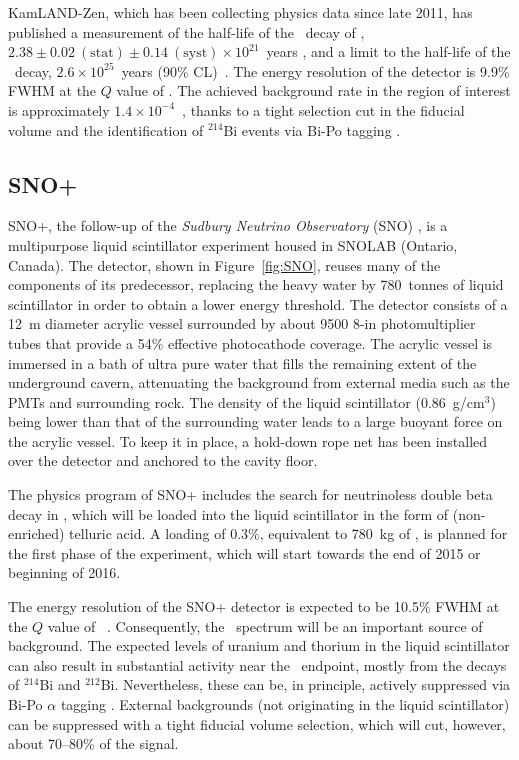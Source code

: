 \documentclass{PoS}
\begin{document}
KamLAND-Zen, which has been collecting physics data since late 2011, has published a measurement of the half-life of the \bbtnu\ decay of \XE, $2.38\pm0.02~(\mathrm{stat})\pm0.14~(\mathrm{syst})\times10^{21}$~years \cite{KamLANDZen:2012aa}, and a limit to the half-life of the \bbonu\ decay, $2.6\times10^{25}$~years (90\% CL)~\cite{Gando:2012zm, Asakura:2014lma}. The energy resolution of the detector is 9.9\% FWHM at the $Q$ value of \XE. The achieved background rate in the region of interest is approximately $1.4\times10^{-4}$~\ckky, thanks to a tight selection cut in the fiducial volume and the identification of $^{214}$Bi events via Bi-Po tagging \cite{Asakura:2014lma}.


\subsection{SNO+} \label{subsec:SNO+}
SNO+, the follow-up of the \emph{Sudbury Neutrino Observatory} (SNO) \cite{Boger:1999bb}, is a multipurpose liquid scintillator experiment housed in SNOLAB (Ontario, Canada). The detector, shown in Figure~\ref{fig:SNO}, reuses many of the components of its predecessor, replacing the heavy water by 780~tonnes of liquid scintillator in order to obtain a lower energy threshold. The detector consists of a 12~m diameter acrylic vessel surrounded by about 9500 8-in photomultiplier tubes that provide a 54\% effective photocathode coverage. The acrylic vessel is immersed in a bath of ultra pure water that fills the remaining extent of the underground cavern, attenuating the background from external media such as the PMTs and surrounding rock. The density of the liquid scintillator (0.86~g/cm$^{3}$) being lower than that of the surrounding water leads to a large buoyant force on the acrylic vessel. To keep it in place, a hold-down rope net has been installed over the detector and anchored to the cavity floor.

The physics program of SNO+ includes the search for neutrinoless double beta decay in \TE, which will be loaded into the liquid scintillator in the form of (non-enriched) telluric acid. A loading of 0.3\%, equivalent to 780~kg of \TE, is planned for the first phase of the experiment, which will start towards the end of 2015 or beginning of 2016. 

The energy resolution of the SNO+ detector is expected to be 10.5\% FWHM at the $Q$ value of \TE\ \cite{Biller:2014eha}. Consequently, the \bbtnu\ spectrum will be an important source of background. The expected levels of uranium and thorium in the liquid scintillator can also result in substantial activity near the \bbonu\ endpoint, mostly from the decays of $^{214}$Bi and $^{212}$Bi. Nevertheless, these can be, in principle, actively suppressed via Bi-Po $\alpha$ tagging \cite{Biller:2014eha}. External backgrounds (not originating in the liquid scintillator) can be suppressed with a tight fiducial volume selection, which will cut, however, about 70--80\% of the signal. 
\end{document}
